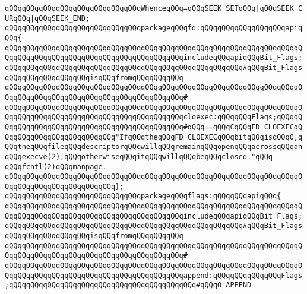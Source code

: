 \newline
\newline
\verb|qQQqqQQqqQQqqQQqqQQqqQQqqQQqqQQqWhenceqQQq=qQQqSEEK_SETqQQq|\verb#|qQQqSEEK_CURqQQq|qQQqSEEK_END;#\newline
\newline
\verb|qQQqqQQqqQQqqQQqqQQqqQQqqQQqqQQqpackageqQQqfd:qQQqqQQqqQQqqQQqqQQqapiqQQq{|\newline
\verb|qQQqqQQqqQQqqQQqqQQqqQQqqQQqqQQqqQQqqQQqqQQqqQQqqQQqqQQqqQQqqQQqqQQqqQQqqQQqqQQqqQQqqQQqqQQqqQQqqQQqqQQqqQQqqQQqincludeqQQqapiqQQqBit_Flags;qQQqqQQqqQQqqQQqqQQqqQQqqQQqqQQqqQQqqQQqqQQqqQQqqQQqqQQq#qQQqBit_FlagsqQQqqQQqqQQqqQQqqQQqisqQQqfromqQQqqQQqqQQq|\newline
\verb|qQQqqQQqqQQqqQQqqQQqqQQqqQQqqQQqqQQqqQQqqQQqqQQqqQQqqQQqqQQqqQQqqQQqqQQqqQQqqQQqqQQqqQQqqQQqqQQqqQQqqQQqqQQqqQQq#|\newline
\verb|qQQqqQQqqQQqqQQqqQQqqQQqqQQqqQQqqQQqqQQqqQQqqQQqqQQqqQQqqQQqqQQqqQQqqQQqqQQqqQQqqQQqqQQqqQQqqQQqqQQqqQQqqQQqqQQqcloexec:qQQqqQQqFlags;qQQqqQQqqQQqqQQqqQQqqQQqqQQqqQQqqQQqqQQqqQQqqQQq#qQQq==qQQqCqQQqFD_CLOEXECqQQqqQQqqQQqqQQqqQQqqQQqqQQq"IfqQQqtheqQQqFD_CLOEXECqQQqbitqQQqisqQQq0,qQQqtheqQQqfileqQQqdescriptorqQQqwillqQQqremainqQQqopenqQQqacrossqQQqanqQQqexecve(2),qQQqotherwiseqQQqitqQQqwillqQQqbeqQQqclosed."qQQq--qQQqfcntl(2)qQQqmanpage.|\newline
\verb|qQQqqQQqqQQqqQQqqQQqqQQqqQQqqQQqqQQqqQQqqQQqqQQqqQQqqQQqqQQqqQQqqQQqqQQqqQQqqQQqqQQqqQQqqQQqqQQq};|\newline
\newline
\verb|qQQqqQQqqQQqqQQqqQQqqQQqqQQqqQQqpackageqQQqflags:qQQqqQQqapiqQQq{|\newline
\verb|qQQqqQQqqQQqqQQqqQQqqQQqqQQqqQQqqQQqqQQqqQQqqQQqqQQqqQQqqQQqqQQqqQQqqQQqqQQqqQQqqQQqqQQqqQQqqQQqqQQqqQQqqQQqqQQqincludeqQQqapiqQQqBit_Flags;qQQqqQQqqQQqqQQqqQQqqQQqqQQqqQQqqQQqqQQqqQQqqQQqqQQqqQQq#qQQqBit_FlagsqQQqqQQqqQQqqQQqqQQqisqQQqfromqQQqqQQqqQQq|\newline
\verb|qQQqqQQqqQQqqQQqqQQqqQQqqQQqqQQqqQQqqQQqqQQqqQQqqQQqqQQqqQQqqQQqqQQqqQQqqQQqqQQqqQQqqQQqqQQqqQQqqQQqqQQqqQQqqQQq#|\newline
\verb|qQQqqQQqqQQqqQQqqQQqqQQqqQQqqQQqqQQqqQQqqQQqqQQqqQQqqQQqqQQqqQQqqQQqqQQqqQQqqQQqqQQqqQQqqQQqqQQqqQQqqQQqqQQqqQQqappend:qQQqqQQqqQQqqQQqFlags;qQQqqQQqqQQqqQQqqQQqqQQqqQQqqQQqqQQqqQQqqQQq#qQQqO_APPEND|\newline
